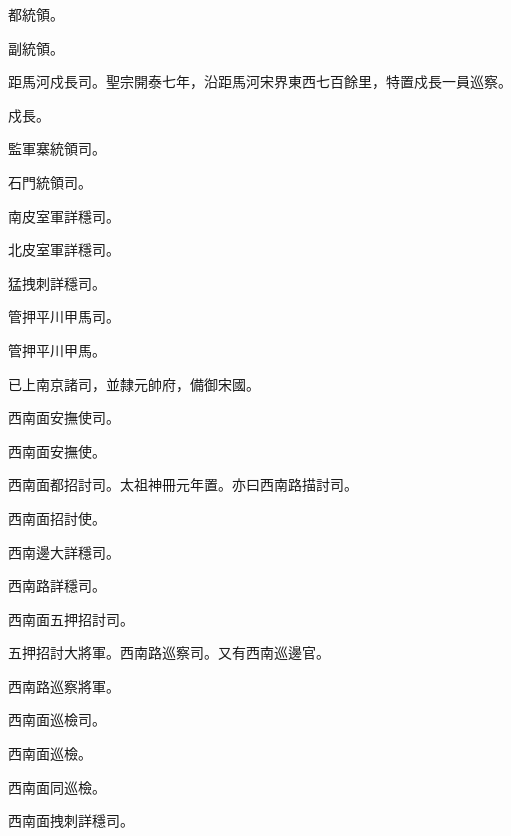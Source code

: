 \begin{pinyinscope}
 都統領。



 副統領。



 距馬河戍長司。聖宗開泰七年，沿距馬河宋界東西七百餘里，特置戍長一員巡察。



 戍長。



 監軍寨統領司。



 石門統領司。



 南皮室軍詳穩司。



 北皮室軍詳穩司。



 猛拽刺詳穩司。



 管押平川甲馬司。



 管押平川甲馬。



 已上南京諸司，並隸元帥府，備御宋國。



 西南面安撫使司。



 西南面安撫使。



 西南面都招討司。太祖神冊元年置。亦曰西南路描討司。



 西南面招討使。



 西南邊大詳穩司。



 西南路詳穩司。



 西南面五押招討司。



 五押招討大將軍。西南路巡察司。又有西南巡邊官。



 西南路巡察將軍。



 西南面巡檢司。



 西南面巡檢。



 西南面同巡檢。



 西南面拽刺詳穩司。




\end{pinyinscope}
